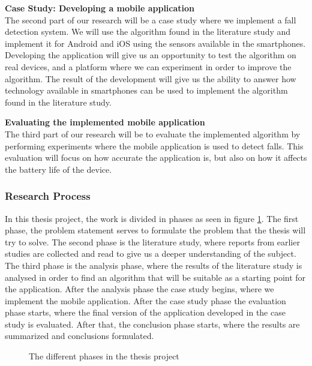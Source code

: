 \documentclass[12pt, a4paper, onecolumn]{article}
\newcommand{\parag}[1]{
	\textbf{#1} \hspace{0pt} \\
}
\begin{document}
	\parag{Case Study: Developing a mobile application}
	The second part of our research will be a case study where we implement a fall detection system. We will use the algorithm found in the literature study and implement it for Android and iOS using the sensors available in the smartphones. Developing the application will give us an opportunity to test the algorithm on real devices, and a platform where we can experiment in order to improve the algorithm. The result of the development will give us the ability to answer how technology available in smartphones can be used to implement the algorithm found in the literature study.
	
	\parag{Evaluating the implemented mobile application}
	The third part of our research will be to evaluate the implemented algorithm by performing experiments where the mobile application is used to detect falls. This evaluation will focus on how accurate the application is, but also on how it affects the battery life of the device.
	
	\subsubsection{Research Process}
	
	In this thesis project, the work is divided in phases as seen in figure \ref{fig:research-process}. The first phase, the problem statement serves to formulate the problem that the thesis will try to solve. The second phase is the literature study, where reports from earlier studies are collected and read to give us a deeper understanding of the subject. The third phase is the analysis phase, where the results of the literature study is analysed in order to find an algorithm that will be suitable as a starting point for the application. After the analysis phase the case study begins, where we implement the mobile application. After the case study phase the evaluation phase starts, where the final version of the application developed in the case study is evaluated. After that, the conclusion phase starts, where the results are summarized and conclusions formulated. 
	
	\begin{figure}[H]
		\centering
		\caption{The different phases in the thesis project}%
		\label{fig:research-process}%
	\end{figure}
	
\end{document}
